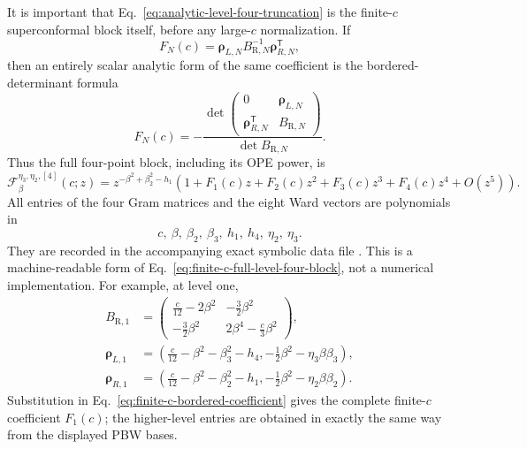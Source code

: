 \documentclass[11pt]{article}
\newcommand{\R}{\mathrm R}
\begin{document}
It is important that Eq.~\eqref{eq:analytic-level-four-truncation} is
the finite-\(c\) superconformal block itself, before any large-\(c\)
normalization.  If
\[
 F_N(c)=
 \bm\rho_{L,N}B_{\R,N}^{-1}\bm\rho_{R,N}^{\mathsf T},
\]
then an entirely scalar analytic form of the same coefficient is the
bordered-determinant formula
\begin{equation}
 F_N(c)=-
 \frac{\det\!\begin{pmatrix}
  0&\bm\rho_{L,N}\\
  \bm\rho_{R,N}^{\mathsf T}&B_{\R,N}
 \end{pmatrix}}
 {\det B_{\R,N}}.
 \label{eq:finite-c-bordered-coefficient}
\end{equation}
Thus the full four-point block, including its OPE power, is
\begin{equation}
 \boxed{
 \mathcal F_{\beta}^{\eta_3,\eta_2,[4]}(c;z)
 =z^{-\beta^2+\beta_2^2-h_1}
 \left(1+F_1(c)z+F_2(c)z^2+F_3(c)z^3+F_4(c)z^4
 +O(z^5)\right).}
 \label{eq:finite-c-full-level-four-block}
\end{equation}
All entries of the four Gram matrices and the eight Ward vectors are
polynomials in
\[
 c,\ \beta,\ \beta_2,\ \beta_3,\ h_1,\ h_4,\ \eta_2,\ \eta_3.
\]
They are recorded in the accompanying exact symbolic data file
.  This is a
machine-readable form of Eq.~\eqref{eq:finite-c-full-level-four-block},
not a numerical implementation.  For example, at level one,
\begin{align*}
B_{\R,1}&=
\begin{pmatrix}
 \frac c{12}-2\beta^2&-\frac32\beta^2\\
 -\frac32\beta^2&2\beta^4-\frac c3\beta^2
\end{pmatrix},\\
\bm\rho_{L,1}&=
\left(\frac c{12}-\beta^2-\beta_3^2-h_4,
-\frac12\beta^2-\eta_3\beta\beta_3\right),\\
\bm\rho_{R,1}&=
\left(\frac c{12}-\beta^2-\beta_2^2-h_1,
-\frac12\beta^2-\eta_2\beta\beta_2\right).
\end{align*}
Substitution in Eq.~\eqref{eq:finite-c-bordered-coefficient} gives the
complete finite-\(c\) coefficient \(F_1(c)\); the higher-level entries
are obtained in exactly the same way from the displayed PBW bases.
\end{document}
